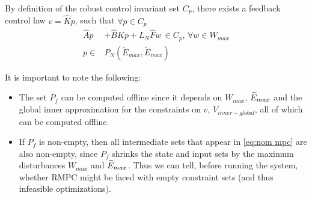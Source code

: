 By definition of the robust control invariant set $C_p$, there exists a feedback control law $v=\hat{K}p$, such that $\forall p\in C_p$
\begin{subequations}
\begin{align}
\label{eq:C_def}
\hat{A}p &+ \hat{B}Kp+L_N \hat{F}w \, \in C_p,\, \forall w \in W_{max} \\
p \in &P_N(\tilde{E}_{max}, \tilde{E}_{max})
\end{align}
\end{subequations}

It is important to note the following:
\begin{itemize}
	\item The set $P_f$ can be computed offline since it depends on $W_{max}$, $\widetilde{E}_{max}$ and the global inner approximation for the constraints on $v$, $V_{inner-global}$, all of which can be computed offline.
	\item If $P_f$ is non-empty, then all intermediate sets that appear in \eqref{eq:nom mpc} are also non-empty, since $P_f$ shrinks the state and input sets by the maximum disturbances $W_{max}$ and $\widetilde{E}_{max}$.	
	Thus we can tell, before running the system, whether RMPC might be faced with empty constraint sets (and thus infeasible optimizations).
\end{itemize}

